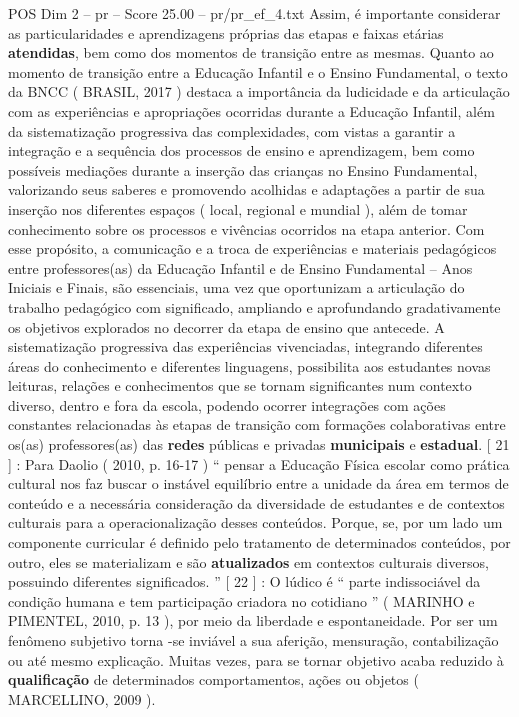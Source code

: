\begin{textsample}{POS Dim 2 – pr – Score 25.00 – pr/pr\_ef\_4.txt}
Assim, é importante considerar as particularidades e aprendizagens próprias das etapas e faixas etárias \textbf{atendidas}, bem como dos momentos de transição entre as mesmas.
Quanto ao momento de transição entre a Educação Infantil e o Ensino Fundamental, o texto da BNCC ( BRASIL, 2017 ) destaca a importância da ludicidade e da articulação com as experiências e apropriações ocorridas durante a Educação Infantil, além da sistematização progressiva das complexidades, com vistas a garantir a integração e a sequência dos processos de ensino e aprendizagem, bem como possíveis mediações durante a inserção das crianças no Ensino Fundamental, valorizando seus saberes e promovendo acolhidas e adaptações a partir de sua inserção nos diferentes espaços ( local, regional e mundial ), além de tomar conhecimento sobre os processos e vivências ocorridos na etapa anterior.
Com esse propósito, a comunicação e a troca de experiências e materiais pedagógicos entre professores(as) da Educação Infantil e de Ensino Fundamental – Anos Iniciais e Finais, são essenciais, uma vez que oportunizam a articulação do trabalho pedagógico com significado, ampliando e aprofundando gradativamente os objetivos explorados no decorrer da etapa de ensino que antecede.
A sistematização progressiva das experiências vivenciadas, integrando diferentes áreas do conhecimento e diferentes linguagens, possibilita aos estudantes novas leituras, relações e conhecimentos que se tornam significantes num contexto diverso, dentro e fora da escola, podendo ocorrer integrações com ações constantes relacionadas às etapas de transição com formações colaborativas entre os(as) professores(as) das \textbf{redes} públicas e privadas \textbf{municipais} e \textbf{estadual}. [ 21 ] : Para Daolio ( 2010, p. 16-17 ) “ pensar a Educação Física escolar como prática cultural nos faz buscar o instável equilíbrio entre a unidade da área em termos de conteúdo e a necessária consideração da diversidade de estudantes e de contextos culturais para a operacionalização desses conteúdos.
Porque, se, por um lado um componente curricular é definido pelo tratamento de determinados conteúdos, por outro, eles se materializam e são \textbf{atualizados} em contextos culturais diversos, possuindo diferentes significados. ” [ 22 ] : O lúdico é “ parte indissociável da condição humana e tem participação criadora no cotidiano ” ( MARINHO e PIMENTEL, 2010, p. 13 ), por meio da liberdade e espontaneidade.
Por ser um fenômeno subjetivo torna -se inviável a sua aferição, mensuração, contabilização ou até mesmo explicação.
Muitas vezes, para se tornar objetivo acaba reduzido à \textbf{qualificação} de determinados comportamentos, ações ou objetos ( MARCELLINO, 2009 ).

\end{textsample}
